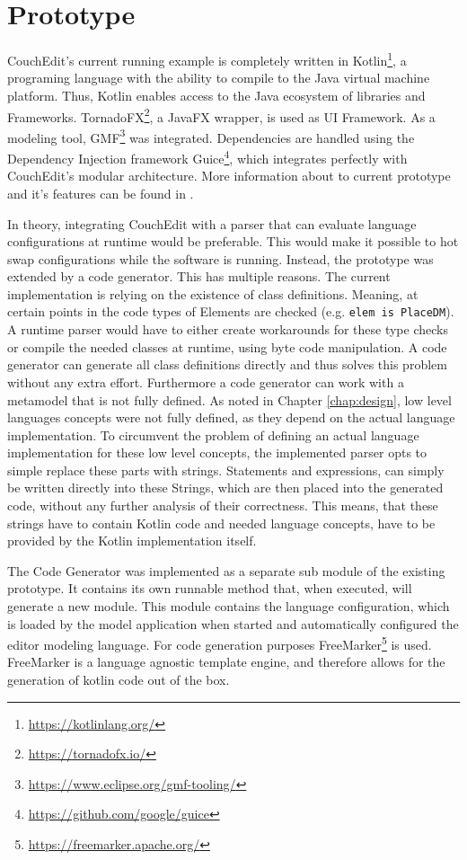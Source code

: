 \chapter{Prototype}
CouchEdit's current running example is completely written in Kotlin\footnote{\url{https://kotlinlang.org/}}, a programing language with the ability to compile to the Java virtual machine platform. Thus, Kotlin enables access to the Java ecosystem of libraries and Frameworks. TornadoFX\footnote{\url{https://tornadofx.io/}}, a JavaFX wrapper, is used as UI Framework. As a modeling tool, GMF\footnote{\url{https://www.eclipse.org/gmf-tooling/}} was integrated. Dependencies are handled using the Dependency Injection framework Guice\footnote{\url{https://github.com/google/guice}}, which integrates perfectly with CouchEdit's modular architecture. More information about to current prototype and it's features can be found in \cite{nachreiner_couchedit_2020}.

In theory, integrating CouchEdit with a parser that can evaluate language configurations at runtime would be preferable. This would make it possible to hot swap configurations while the software is running. Instead, the prototype was extended by a code generator. This has multiple reasons. The current implementation is relying on the existence of class definitions. Meaning, at certain points in the code types of Elements are checked (e.g. \texttt{elem is PlaceDM}). A runtime parser would have to either create workarounds for these type checks or compile the needed classes at runtime, using byte code manipulation. A code generator can generate all class definitions directly and thus solves this problem without any extra effort. Furthermore a code generator can work with a metamodel that is not fully defined. As noted in Chapter \ref{chap:design}, low level languages concepts were not fully defined, as they depend on the actual language implementation. To circumvent the problem of defining an actual language implementation for these low level concepts, the implemented parser opts to simple replace these parts with strings. Statements and expressions, can simply be written directly into these Strings, which are then placed into the generated code, without any further analysis of their correctness. This means, that these strings have to contain Kotlin code and needed language concepts, have to be provided by the Kotlin implementation itself.

The Code Generator was implemented as a separate sub module of the existing prototype. It contains its own runnable method that, when executed, will generate a new module. This module contains the language configuration, which is loaded by the model application when started and automatically configured the editor modeling language. For code generation purposes FreeMarker\footnote{\url{https://freemarker.apache.org/}} is used. FreeMarker is a language agnostic template engine, and therefore allows for the generation of kotlin code out of the box. 

